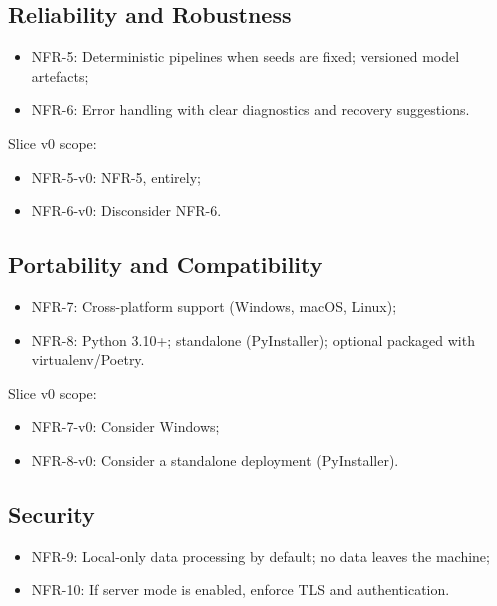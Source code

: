 \subsection{Reliability and Robustness}

\begin{itemize}
    \item NFR-5: Deterministic pipelines when seeds are fixed; versioned model artefacts;
    \item NFR-6: Error handling with clear diagnostics and recovery suggestions.
\end{itemize}

Slice v0 scope:

\begin{itemize}
    \item NFR-5-v0: NFR-5, entirely;
    \item NFR-6-v0: Disconsider NFR-6.
\end{itemize}

\subsection{Portability and Compatibility}

\begin{itemize}
    \item NFR-7: Cross-platform support (Windows, macOS, Linux);
    \item NFR-8: Python 3.10+; standalone (PyInstaller); optional packaged with virtualenv/Poetry.
\end{itemize}

Slice v0 scope:

\begin{itemize}
    \item NFR-7-v0: Consider Windows;
    \item NFR-8-v0: Consider a standalone deployment (PyInstaller).
\end{itemize}

\subsection{Security}

\begin{itemize}
    \item NFR-9: Local-only data processing by default; no data leaves the machine;
    \item NFR-10: If server mode is enabled, enforce TLS and authentication.
\end{itemize}

